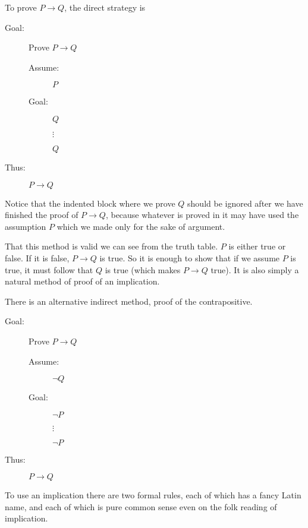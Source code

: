 \documentclass[12pt]{article}
\begin{document}
To prove $P \rightarrow Q$, the direct strategy is

\begin{description}

\item[Goal:]  Prove $P \rightarrow Q$

\begin{description}
\item[Assume:] $P$

\item[Goal:] $Q$

$\vdots$

$Q$


\end{description}
\item [Thus:]  $P \rightarrow Q$
\end{description}

Notice that the indented block where we prove $Q$ should be ignored after we have finished the proof of $P \rightarrow Q$, because whatever is proved in it may have used the assumption $P$ which we made only for the sake of argument.

That this method is valid we can see from the truth table.  $P$ is either true or false.  If it is false, $P \rightarrow Q$ is true.  So it is enough to show that if we assume $P$ is true, it must follow that $Q$ is true (which makes $P \rightarrow Q$ true).  It is also simply a natural method of proof of an implication.

There is an alternative indirect method, proof of the contrapositive.

\begin{description}

\item[Goal:]  Prove $P \rightarrow Q$

\begin{description}
\item[Assume:] $\neg Q$

\item[Goal:] $\neg P$

$\vdots$

$\neg P$


\end{description}
\item [Thus:]  $P \rightarrow Q$
\end{description}

To use an implication there are two formal rules, each of which has a fancy Latin name, and each of which is pure common sense even on the folk reading of implication.
\end{document}
